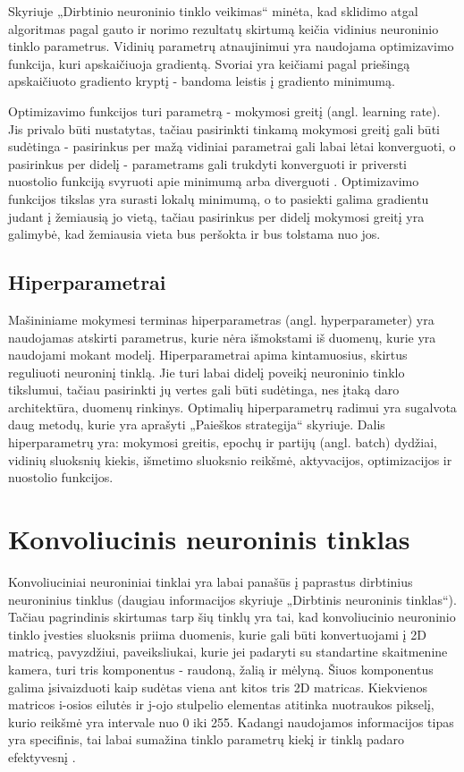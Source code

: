 \documentclass{VUMIFPSbakalaurinis}
\begin{document}
Skyriuje „Dirbtinio neuroninio tinklo veikimas“ minėta, kad sklidimo atgal algoritmas pagal gauto ir norimo 
rezultatų skirtumą keičia vidinius neuroninio tinklo parametrus. Vidinių parametrų atnaujinimui yra naudojama 
optimizavimo funkcija, kuri apskaičiuoja gradientą. Svoriai yra keičiami pagal priešingą apskaičiuoto gradiento 
kryptį - bandoma leistis į gradiento minimumą.

Optimizavimo funkcijos turi parametrą - mokymosi greitį (angl. learning rate). Jis privalo būti nustatytas, tačiau 
pasirinkti tinkamą mokymosi greitį gali būti sudėtinga - pasirinkus per mažą vidiniai parametrai gali labai lėtai 
konverguoti, o pasirinkus per didelį - parametrams gali trukdyti konverguoti ir priversti nuostolio funkciją svyruoti
apie minimumą arba diverguoti \cite{leondes1998image}. Optimizavimo funkcijos tikslas yra surasti lokalų minimumą, 
o to pasiekti galima gradientu judant į žemiausią jo vietą, tačiau pasirinkus per didelį mokymosi greitį yra galimybė, 
kad žemiausia vieta bus peršokta ir bus tolstama nuo jos.

\subsection{Hiperparametrai}

Mašininiame mokymesi terminas hiperparametras (angl. hyperparameter) yra naudojamas atskirti parametrus, kurie nėra išmokstami iš duomenų, kurie yra naudojami mokant modelį. Hiperparametrai apima kintamuosius, skirtus reguliuoti neuroninį tinklą. Jie turi labai didelį poveikį neuroninio tinklo tikslumui, tačiau pasirinkti jų vertes gali būti sudėtinga, nes įtaką daro architektūra, duomenų rinkinys. Optimalių hiperparametrų radimui yra sugalvota daug metodų, kurie yra aprašyti „Paieškos strategija“ skyriuje. 
Dalis hiperparametrų yra: mokymosi greitis, epochų ir partijų (angl. batch) dydžiai, vidinių sluoksnių kiekis, išmetimo sluoksnio reikšmė, aktyvacijos, optimizacijos ir nuostolio funkcijos. 

\section{Konvoliucinis neuroninis tinklas}
Konvoliuciniai neuroniniai tinklai yra labai panašūs į paprastus dirbtinius neuroninius tinklus (daugiau informacijos skyriuje „Dirbtinis neuroninis
tinklas“). Tačiau pagrindinis skirtumas tarp šių tinklų yra tai, kad konvoliucinio neuroninio tinklo įvesties sluoksnis priima duomenis, kurie gali būti konvertuojami į 2D matricą, pavyzdžiui, paveiksliukai, 
kurie jei padaryti su standartine skaitmenine kamera, turi tris komponentus - raudoną, žalią ir mėlyną. Šiuos komponentus galima 
įsivaizduoti kaip sudėtas viena ant kitos tris 2D matricas. Kiekvienos matricos i-osios eilutės ir j-ojo stulpelio elementas 
atitinka nuotraukos pikselį, kurio reikšmė yra intervale nuo 0 iki 255. Kadangi naudojamos informacijos tipas yra specifinis, 
tai labai sumažina tinklo parametrų kiekį ir tinklą padaro efektyvesnį \cite{CnnImages}.
\end{document}
